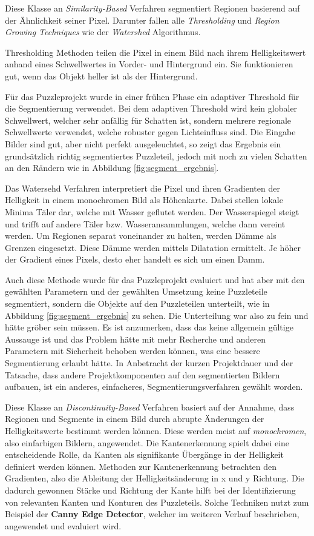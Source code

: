 Diese Klasse an \textit{Similarity-Based} Verfahren segmentiert Regionen basierend auf der Ähnlichkeit seiner Pixel.
Darunter fallen alle \textit{Thresholding} und \textit{Region Growing Techniques} wie der \textit{Watershed} Algorithmus.

Thresholding Methoden teilen die Pixel in einem Bild nach ihrem Helligkeitswert anhand eines Schwellwertes in Vorder- und Hintergrund ein.
Sie funktionieren gut, wenn das Objekt heller ist als der Hintergrund.

Für das Puzzleprojekt wurde in einer frühen Phase ein adaptiver Threshold für die Segmentierung verwendet.
Bei dem adaptiven Threshold wird kein globaler Schwellwert, welcher sehr anfällig für Schatten ist, sondern mehrere regionale Schwellwerte verwendet, welche robuster gegen Lichteinfluss sind.
Die Eingabe Bilder sind gut, aber nicht perfekt ausgeleuchtet, so zeigt das Ergebnis ein grundsätzlich richtig segmentiertes Puzzleteil, jedoch mit noch zu vielen Schatten an den Rändern wie in Abbildung \ref{fig:segment_ergebnis}.

Das Watersehd Verfahren interpretiert die Pixel und ihren Gradienten der Helligkeit in einem monochromen Bild als Höhenkarte.
Dabei stellen lokale Minima Täler dar, welche mit Wasser geflutet werden.
Der Wasserspiegel steigt und trifft auf andere Täler bzw. Wasseransammlungen, welche dann vereint werden.
Um Regionen separat voneinander zu halten, werden Dämme als Grenzen eingesetzt.
Diese Dämme werden mittels Dilatation ermittelt.
Je höher der Gradient eines Pixels, desto eher handelt es sich um einen Damm.

Auch diese Methode wurde für das Puzzleprojekt evaluiert und hat aber mit den gewählten Parametern und der gewählten Umsetzung keine Puzzleteile segmentiert, sondern die Objekte auf den Puzzleteilen unterteilt, wie in Abbildung \ref{fig:segment_ergebnis} zu sehen.
Die Unterteilung war also zu fein und hätte gröber sein müssen.
Es ist anzumerken, dass das keine allgemein gültige Aussauge ist und das Problem hätte mit mehr Recherche und anderen Parametern mit Sicherheit behoben werden können, was eine bessere Segmentierung erlaubt hätte.
In Anbetracht der kurzen Projektdauer und der Tatsache, dass andere Projektkomponenten auf den segmentierten Bildern aufbauen, ist ein anderes, einfacheres, Segmentierungsverfahren gewählt worden.

Diese Klasse an \textit{Discontinuity-Based} Verfahren basiert auf der Annahme, dass Regionen und Segmente in einem Bild durch abrupte Änderungen der Helligkeitswerte bestimmt werden können.
Diese werden meist auf \textit{monochromen}, also einfarbigen Bildern, angewendet.
Die Kantenerkennung spielt dabei eine entscheidende Rolle, da Kanten als signifikante Übergänge in der Helligkeit definiert werden können.
Methoden zur Kantenerkennung betrachten den Gradienten, also die Ableitung der Helligkeitsänderung in x und y Richtung.
Die dadurch gewonnen Stärke und Richtung der Kante hilft bei der Identifizierung von relevanten Kanten und Konturen des Puzzleteils.
Solche Techniken nutzt zum Beispiel der \textbf{Canny Edge Detector}, welcher im weiteren Verlauf beschrieben, angewendet und evaluiert wird.

